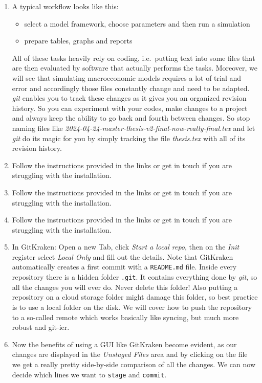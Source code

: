 \begin{enumerate}
\item
A typical workflow looks like this:
\begin{itemize}
\item select a model framework, choose parameters and then run a simulation
\item prepare tables, graphs and reports
\end{itemize}
All of these tasks heavily rely on coding, i.e.\ putting text into some files that are then evaluated by software that actually performs the tasks.
Moreover, we will see that simulating macroeconomic models requires a lot of trial and error and accordingly those files constantly change and need to be adapted.
\emph{git} enables you to track these changes as it gives you an organized revision history.
So you can experiment with your codes, make changes to a project and always keep the ability to go back and fourth between changes.
So stop naming files like \emph{2024{-}04{-}24-master-thesis-v2-final-now-really-final.tex}
  and let \emph{git} do its magic for you by simply tracking the file \emph{thesis.tex} with all of its revision history.

\item
Follow the instructions provided in the links or get in touch if you are struggling with the installation.

\item
Follow the instructions provided in the links or get in touch if you are struggling with the installation.

\item
Follow the instructions provided in the links or get in touch if you are struggling with the installation.

\item
In GitKraken: Open a new Tab, click \emph{Start a local repo}, then on the \emph{Init} register select \emph{Local Only} and fill out the details.
Note that GitKraken automatically creates a first commit with a \texttt{README.md} file.
Inside every repository there is a hidden folder \texttt{.git}.
It contains everything done by \emph{git}, so all the changes you will ever do.
Never delete this folder!
Also putting a repository on a cloud storage folder might damage this folder,
  so best practice is to use a local folder on the disk.
We will cover how to push the repository to a so-called remote which works basically like syncing,
  but much more robust and git-ier.

\item
Now the benefits of using a GUI like GitKraken become evident,
  as our changes are displayed in the \emph{Unstaged Files} area
  and by clicking on the file we get a really pretty side-by-side comparison of all the changes.
We can now decide which lines we want to \texttt{stage} and \texttt{commit}.


\end{enumerate}
